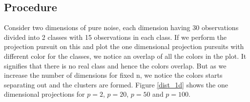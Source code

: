 \documentclass[12]{report}
\begin{document}
\subsection{Procedure}

Consider two dimensions of pure noise, each dimension having 30 observations divided into 2 classes with 15 observations in each class. If we perform the projection pursuit on this and plot the one dimensional projection pursuits with different color for the classes, we notice an overlap of all the colors in the plot. It signifies that there is no real class and hence the colors overlap. But as we increase the number of dimensions for fixed n, we notice the colors starts separating out and the clusters are formed. Figure \ref{dist_1d} shows the one dimensional projections for $p=2$, $p=20$, $p=50$ and $p=100$. \\


\end{document}

